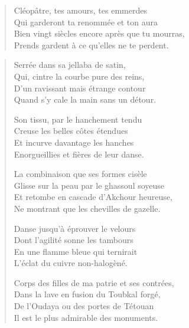 \begin{verse}
  Cléopâtre, tes amours, tes emmerdes\\ 
  Qui garderont ta renommée et ton aura\\ 
  Bien vingt siècles encore après que tu mourras,\\ 
  Prends gardent à ce qu’elles ne te perdent.  %
\end{verse}

\begin{verse}\quatrain
  Serrée dans sa jellaba de satin,\\ 
  Qui, cintre la courbe pure des reins,\\ 
  D’un ravissant mais étrange contour\\ 
  Quand s’y cale la main sans un détour.  %

  Son tissu, par le hanchement tendu\\ 
  Creuse les belles côtes étendues\\ 
  Et incurve davantage les hanches\\ 
  Enorgueillies et fières de leur danse.  %

  La combinaison que ses formes cisèle\\ 
  Glisse sur la peau par le ghassoul  %
   soyeuse\\  %
  Et retombe en cascade d’Akchour heureuse,\\ 
  Ne montrant que les chevilles de gazelle.  %

  Danse jusqu’à éprouver le velours\\ 
  Dont l’agilité sonne les tambours\\ 
  En une flamme bleue qui ternirait\\ 
  L’éclat du cuivre non-halogèné.  %

  Corps des filles de ma patrie et ses contrées,\\ 
  Dans la lave en fusion du Toubkal forgé,\\ 
  De l’Oudaya ou des portes de Tétouan\\ 
  Il est le plus admirable des monuments.  %
\end{verse}


